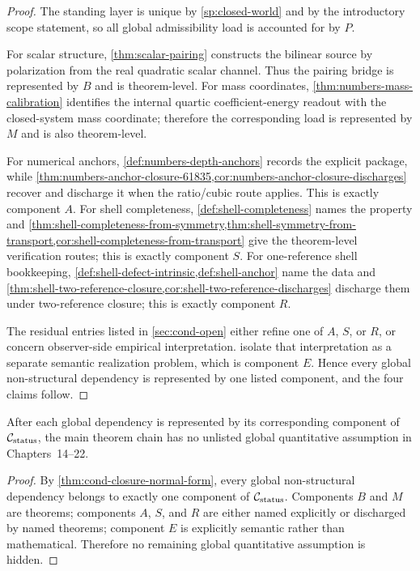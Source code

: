 \begin{proof}
The standing layer is unique by \cref{sp:closed-world} and by the
introductory scope statement, so all global admissibility load is accounted
for by \(P\).

For scalar structure, \cref{thm:scalar-pairing} constructs the bilinear source
by polarization from the real quadratic scalar channel.  Thus the
pairing bridge is represented by \(B\) and is theorem-level.  For mass
coordinates, \cref{thm:numbers-mass-calibration} identifies the internal
quartic coefficient-energy readout with the closed-system mass coordinate;
therefore the corresponding load is represented by \(M\) and is also
theorem-level.

For numerical anchors, \cref{def:numbers-depth-anchors} records the explicit
package, while \cref{thm:numbers-anchor-closure-61835,cor:numbers-anchor-closure-discharges}
recover and discharge it when the ratio/cubic route applies.  This is exactly
component \(A\).  For shell completeness,
\cref{def:shell-completeness} names the property and
\cref{thm:shell-completeness-from-symmetry,thm:shell-symmetry-from-transport,cor:shell-completeness-from-transport}
give the theorem-level verification routes; this is exactly component \(S\).
For one-reference shell bookkeeping,
\cref{def:shell-defect-intrinsic,def:shell-anchor} name the data and
\cref{thm:shell-two-reference-closure,cor:shell-two-reference-discharges}
discharge them under two-reference closure; this is exactly component \(R\).

The residual entries listed in \cref{sec:cond-open} either refine one of
\(A\), \(S\), or \(R\), or concern observer-side empirical interpretation.
isolate that interpretation as a separate semantic realization problem,
which is component \(E\).  Hence every global non-structural dependency is
represented by one listed component, and the four claims follow.
\end{proof}

\begin{corollary}
\label{cor:cond-no-hidden-global-assumptions}
After each global dependency is represented by its corresponding component
of \(\mathcal C_{\rm status}\), the main theorem chain has no unlisted global
quantitative assumption in Chapters~14--22.
\end{corollary}

\begin{proof}
By \cref{thm:cond-closure-normal-form}, every global non-structural dependency
belongs to exactly one component of \(\mathcal C_{\rm status}\).  Components
\(B\) and \(M\) are theorems; components \(A\), \(S\), and \(R\) are either
named explicitly or discharged by named theorems; component \(E\) is explicitly
semantic rather than mathematical.  Therefore no remaining global
quantitative assumption is hidden.
\end{proof}

